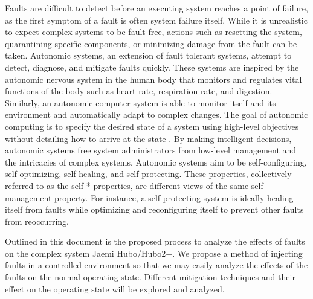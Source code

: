 Faults are difficult to detect before an executing system reaches a point of failure, as the first symptom of a fault is often system failure itself. While it is unrealistic to expect complex systems to be fault-free, actions such as resetting the system, quarantining specific components, or minimizing damage from the fault can be taken. Autonomic systems, an extension of fault tolerant systems, attempt to detect, diagnose, and mitigate faults quickly. These systems are inspired by the autonomic nervous system in the human body that monitors and regulates vital  functions of the body such as heart rate, respiration rate, and digestion. Similarly, an autonomic computer system is able to monitor itself and its environment and automatically adapt to complex changes. The goal of autonomic computing is to specify the desired state of a system using high-level objectives without detailing how to arrive at the state \cite{1160055,4061119,1301340}. By making intelligent decisions, autonomic systems free system administrators from low-level management and the intricacies of complex systems. Autonomic systems aim to be self-configuring, self-optimizing, self-healing, and self-protecting. These properties, collectively referred to as the self-* properties, are different views of the same self-man\-age\-ment property. For instance, a self-protecting system is ideally healing itself from faults while optimizing and reconfiguring itself to prevent other faults from reoccurring.

Outlined in this document is the proposed process to analyze the effects of faults on the complex system Jaemi Hubo/Hubo2+.  We propose a method of injecting faults in a controlled environment so that we may easily analyze the effects of the faults on the normal operating state.  Different mitigation techniques and their effect on the operating state will be explored and analyzed.








